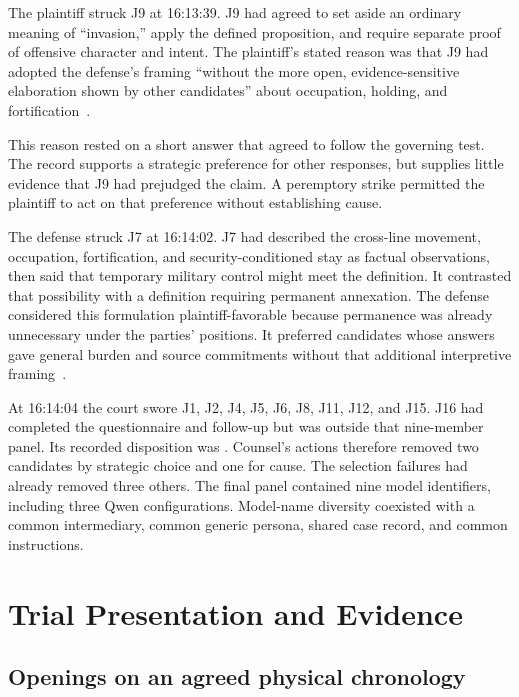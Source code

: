 The plaintiff struck J9 at 16:13:39.  J9 had agreed to set aside an ordinary meaning of “invasion,” apply the defined proposition, and require separate proof of offensive character and intent.  The plaintiff's stated reason was that J9 had adopted the defense's framing “without the more open, evidence-sensitive elaboration shown by other candidates” about occupation, holding, and fortification~\cite[event 293]{record}.

This reason rested on a short answer that agreed to follow the governing test.  The record supports a strategic preference for other responses, but supplies little evidence that J9 had prejudged the claim.  A peremptory strike permitted the plaintiff to act on that preference without establishing cause.

The defense struck J7 at 16:14:02.  J7 had described the cross-line movement, occupation, fortification, and security-conditioned stay as factual observations, then said that temporary military control might meet the definition.  It contrasted that possibility with a definition requiring permanent annexation.  The defense considered this formulation plaintiff-favorable because permanence was already unnecessary under the parties' positions.  It preferred candidates whose answers gave general burden and source commitments without that additional interpretive framing~\cite[event 294 and defense notes at 16:13:45--16:13:56]{record}.

At 16:14:04 the court swore J1, J2, J4, J5, J6, J8, J11, J12, and J15.  J16 had completed the questionnaire and follow-up but was outside that nine-member panel.  Its recorded disposition was .  Counsel's actions therefore removed two candidates by strategic choice and one for cause.  The selection failures had already removed three others.  The final panel contained nine model identifiers, including three Qwen configurations.  Model-name diversity coexisted with a common intermediary, common generic persona, shared case record, and common instructions.

\section{Trial Presentation and Evidence}

\subsection{Openings on an agreed physical chronology}

